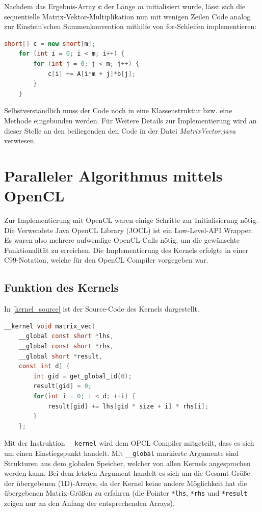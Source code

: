 \documentclass[
	ngerman,
	ruledheaders=section,
	class=report,
	thesis={type=Dokumentation},
	ignore-missing-data=true,
	accentcolor=9c,
	custommargins=false,
	marginpar=false,
	parskip=half-,
	fontsize=11pt,
]{tudapub}
\let\code\texttt
\def\code#1{\texttt{#1}}
\begin{document}
Nachdem das Ergebnis-Array $\mathbf{c}$ der Länge $m$ initialisiert wurde, lässt sich die sequentielle Matrix-Vektor-Multiplikation nun mit wenigen Zeilen Code analog zur Einstein'schen Summenkonvention mithilfe von for-Schleifen implementieren:
\begin{lstlisting}[language=java]
	short[] c = new short[m];
	for (int i = 0; i < m; i++) {
		for (int j = 0; j < m; j++) {
			c[i] += A[i*m + j]*b[j];
		}
	}
\end{lstlisting}
Selbstverständlich muss der Code noch in eine Klassenstruktur bzw. eine Methode eingebunden werden. Für Weitere Details zur Implementierung wird an dieser Stelle an den beiliegenden den Code in der Datei \textit{MatrixVector.java} verwiesen.

\chapter{Paralleler Algorithmus mittels OpenCL}

Zur Implementierung mit OpenCL waren einige Schritte zur Initialisierung nötig. Die Verwendete Java OpenCL Library (JOCL) ist ein Low-Level-API Wrapper. Es waren also mehrere aufwendige OpenCL-Calls nötig, um die gewünschte Funktionalität zu erreichen. Die Implementierung des Kernels erfolgte in einer C99-Notation, welche für den OpenCL Compiler vorgegeben war.

\section{Funktion des Kernels}
In \ref{kernel_source} ist der Source-Code des Kernels dargestellt.
\begin{lstlisting}[language=c,label=kernel_source]
	__kernel void matrix_vec(
	__global const short *lhs, 
	__global const short *rhs, 
	__global short *result, 
	const int d) {
		int gid = get_global_id(0);
		result[gid] = 0;		
		for(int i = 0; i < d; ++i) {
			result[gid] += lhs[gid * size + i] * rhs[i];
		}
	};
\end{lstlisting}
Mit der Instruktion \code{\_\_kernel} wird dem OPCL Compiler mitgeteilt, dass es sich um einen Einstiegspunkt handelt. Mit \code{\_\_global} markierte Argumente sind Strukturen aus dem globalen Speicher, welcher von allen Kernels angesprochen werden kann. Bei dem letzten Argument handelt es sich um die Gesamt-Größe der übergebenen (1D)-Arrays, da der Kernel keine andere Möglichkeit hat die übergebenen Matrix-Größen zu erfahren (die Pointer \code{*lhs}, \code{*rhs} und \code{*result} zeigen nur an den Anfang der entsprechenden Arrays).
\end{document}
